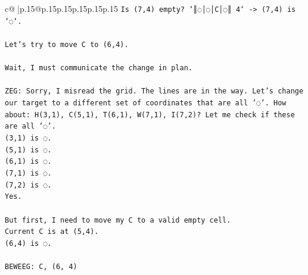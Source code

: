\documentclass{article}
\begin{document}
{\begin{supertabular}{c@{$\;$}|p{.15\linewidth}@{}p{.15\linewidth}p{.15\linewidth}p{.15\linewidth}p{.15\linewidth}p{.15\linewidth}}
{{{\texttt{Is (7,4) empty? `║◌│◌│C│◌║ 4` {-}> (7,4) is `◌`.} \\
\\ 
\texttt{Let's try to move C to (6,4).} \\
\\ 
\texttt{Wait, I must communicate the change in plan.} \\
\\ 
\texttt{ZEG: Sorry, I misread the grid. The lines are in the way. Let's change our target to a different set of coordinates that are all '◌'. How about: H(3,1), C(5,1), T(6,1), W(7,1), I(7,2)? Let me check if these are all '◌'.} \\
\texttt{(3,1) is ◌.} \\
\texttt{(5,1) is ◌.} \\
\texttt{(6,1) is ◌.} \\
\texttt{(7,1) is ◌.} \\
\texttt{(7,2) is ◌.} \\
\texttt{Yes.} \\
\\ 
\texttt{But first, I need to move my C to a valid empty cell.} \\
\texttt{Current C is at (5,4).} \\
\texttt{(6,4) is ◌.} \\
\\ 
\texttt{BEWEEG: C, (6, 4)} \\
            }
        }
    }
     \\ \\


\end{supertabular}}
\end{document}
